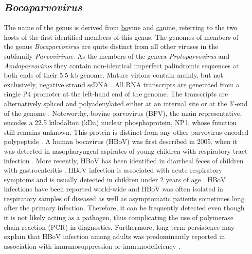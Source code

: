 \subsection{\textit{Bocaparvovirus}}
The name of the genus is derived from \underline{bo}vine and \underline{ca}nine, referring to the two hosts of the first identified members of this genus.  The genomes of members of the genus \textit{Bocaparvovirus} are quite distinct from all other viruses in the subfamily \textit{Parvovirinae}. As the members of the genera \textit{Protoparvovirus} and \textit{Amdoparvovirus} they contain non-identical imperfect palindromic sequences at both ends of their 5.5 kb genome. Mature virions contain mainly, but not exclusively, negative strand ssDNA \cite{pmid3783814,pmid12441065}.
All RNA transcripts are generated from a single P4 promoter at the left-hand end of the genome. The transcripts are alternatively spliced and polyadenylated either at an internal site or at the 3’-end of the genome \cite{pmid17715221}. Noteworthy, bovine parvovirus (BPV), the main representative, encodes a 22.5 kilodalton (kDa) nuclear phosphoprotein, NP1, whose function still remains unknown. This protein is distinct from any other parvovirus-encoded polypeptide \cite{pmid6319731}.
A human bocavirus (HBoV) was first described in 2005, when it was detected in nasopharyngeal aspirates of young children with respiratory tract infection \cite{pmid11562506, pmid16118271}. More recently, HBoV has been identified in diarrheal feces of children with gastroenteritis \cite{pmid17553287}. HBoV infection is associated with acute respiratory symptoms and is usually detected in children under 2 years of age \cite{pmid17122013, pmid16517912, pmid17041855}. HBoV infections have been reported world-wide and HBoV was often isolated in respiratory samples of diseased as well as asymptomatic patients sometimes long after the primary infection. Therefore, it can be frequently detected even though it is not likely acting as a pathogen, thus complicating the use of polymerase chain reaction (PCR) in diagnostics. Furthermore, long-term persistence may explain that HBoV infection among adults was predominantly reported in association with immunosuppression or immunodeficiency \cite{pmid17041855, pmid17176591}.         






